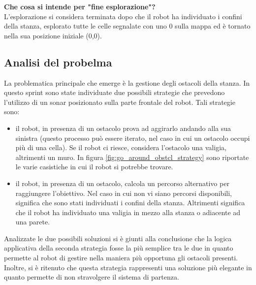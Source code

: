 \textbf{Che cosa si intende per "fine esplorazione"?}\\
L'esplorazione si considera terminata dopo che il robot ha individuato i confini della stanza, esplorato tutte le celle segnalate con uno 0 sulla mappa ed è tornato nella sua posizione iniziale (0,0).

\subsection{Analisi del probelma}

La problematica principale che emerge è la
gestione degli ostacoli della stanza. In questo sprint sono state individuate due possibili strategie che prevedono l'utilizzo di un sonar posizionato sulla parte frontale del robot. Tali strategie sono:
\begin{itemize}
    \item il robot, in presenza di un ostacolo prova ad aggirarlo andando alla sua sinistra (questo processo può essere iterato, nel caso in cui un ostacolo occupi più di una cella). Se il robot ci riesce, considera l'ostacolo una valigia, altrimenti un muro. In figura \cref{fig:go_around_obstcl_strategy} sono riportate le varie casistiche in cui il robot si potrebbe trovare.
    \item il robot, in presenza di un ostacolo, calcola un percorso alternativo per raggiungere l'obiettivo. Nel caso in cui non vi siano percorsi disponibili, significa che sono stati individuati i confini della stanza. Altrimenti significa che il robot ha individuato una valigia in mezzo alla stanza o adiacente ad una parete.

\end{itemize}

Analizzate le due possibili soluzioni si è giunti alla conclusione che la logica applicativa della seconda strategia fosse la più semplice tra le due in quanto permette al robot di gestire nella maniera più opportuna gli ostacoli presenti. Inoltre, si è ritenuto che questa strategia rappresenti una soluzione più elegante in quanto permette di non stravolgere il sistema di partenza.

